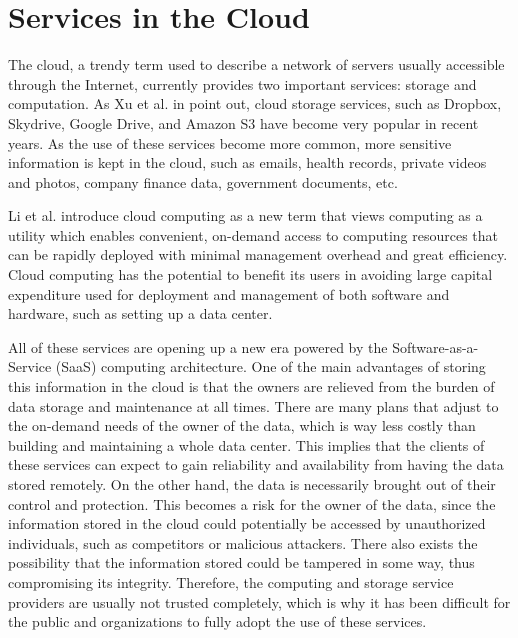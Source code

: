\section{Services in the Cloud}

The cloud, a trendy term used to describe a network of servers usually accessible through the Internet, currently provides two important services: storage and computation. As Xu et al. in \cite{cryptoeprint:2011:574} point out, cloud storage services, such as Dropbox, Skydrive, Google Drive, and Amazon S3 have become very popular in recent years. As the use of these services become more common, more sensitive information is kept in the cloud, such as emails, health records, private videos and photos, company finance data, government documents, etc. 

Li et al. \cite{cryptoeprint:2009:593} introduce cloud computing as a new term that views computing as a utility which enables convenient, on-demand access to computing resources that can be rapidly deployed with minimal management overhead and great efficiency. Cloud computing has the potential to benefit its users in avoiding large capital expenditure used for deployment and management of both software and hardware, such as setting up a data center. 

All of these services are opening up a new era powered by the Software-as-a-Service (SaaS) computing architecture. One of the main advantages of storing this information in the cloud is that the owners are relieved from the burden of data storage and maintenance at all times. There are many plans that adjust to the on-demand needs of the owner of the data, which is way less costly than building and maintaining a whole data center. This implies that the clients of these services can expect to gain reliability and availability from having the data stored remotely. On the other hand, the data is necessarily brought out of their control and protection. This becomes a risk for the owner of the data, since the information stored in the cloud could potentially be accessed by unauthorized individuals, such as competitors or malicious attackers. There also exists the possibility that the information stored could be tampered in some way, thus compromising its integrity. Therefore, the computing and storage service providers are usually not trusted completely, which is why it has been difficult for the public and organizations to fully adopt the use of these services.

